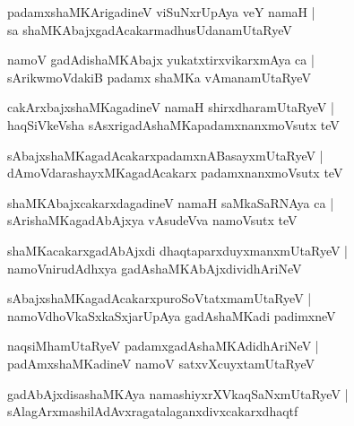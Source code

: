\documentclass[twoside,12pt,openright]{book}
\newcounter{shloka}[chapter]
\begin{document}
\begin{shloka}%
padamxshaMKArigadineV viSuNxrUpAya veY namaH |\\
sa shaMKAbajxgadAcakarmadhusUdanamUtaRyeV
\end{shloka}

\begin{shloka}%
namoV gadAdishaMKAbajx yukatxtirxvikarxmAya ca |\\
sArikwmoVdakiB padamx shaMKa vAmanamUtaRyeV
\end{shloka}

\begin{shloka}%
cakArxbajxshaMKagadineV namaH shirxdharamUtaRyeV |\\
haqSiVkeVsha sAsxrigadAshaMKapadamxnanxmoVsutx teV
\end{shloka}

\begin{shloka}%
sAbajxshaMKagadAcakarxpadamxnABasayxmUtaRyeV |\\
dAmoVdarashayxMKagadAcakarx padamxnanxmoVsutx teV
\end{shloka}

\begin{shloka}%
shaMKAbajxcakarxdagadineV namaH saMkaSaRNAya ca |\\
sArishaMKagadAbAjxya vAsudeVva namoVsutx teV
\end{shloka}

\begin{shloka}%
shaMKacakarxgadAbAjxdi dhaqtaparxduyxmanxmUtaRyeV |\\
namoVnirudAdhxya gadAshaMKAbAjxdividhAriNeV 
\end{shloka}

\begin{shloka}%
sAbajxshaMKagadAcakarxpuroSoVtatxmamUtaRyeV |\\
namoVdhoVkaSxkaSxjarUpAya gadAshaMKadi padimxneV 
\end{shloka}

\begin{shloka}%
naqsiMhamUtaRyeV padamxgadAshaMKAdidhAriNeV |\\
padAmxshaMKadineV namoV satxvXcuyxtamUtaRyeV 
\end{shloka}

\begin{shloka}%
gadAbAjxdisashaMKAya namashiyxrXVkaqSaNxmUtaRyeV |\\
sAlagArxmashilAdAvxragatalaganxdivxcakarxdhaqtf 
\end{shloka}
\end{document}
